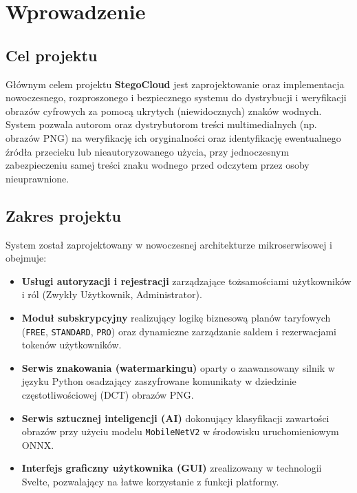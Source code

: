 \documentclass[12pt,a4paper]{article}
\begin{document}
\newpage

{
  \hypersetup{linkcolor=black}
  \tableofcontents
}
\newpage

\section{Wprowadzenie}

\subsection{Cel projektu}
Głównym celem projektu \textbf{StegoCloud} jest zaprojektowanie oraz implementacja nowoczesnego, rozproszonego i bezpiecznego systemu do dystrybucji i weryfikacji obrazów cyfrowych za pomocą ukrytych (niewidocznych) znaków wodnych. System pozwala autorom oraz dystrybutorom treści multimedialnych (np. obrazów PNG) na weryfikację ich oryginalności oraz identyfikację ewentualnego źródła przecieku lub nieautoryzowanego użycia, przy jednoczesnym zabezpieczeniu samej treści znaku wodnego przed odczytem przez osoby nieuprawnione.

\subsection{Zakres projektu}
System został zaprojektowany w nowoczesnej architekturze mikroserwisowej i obejmuje:
\begin{itemize}
    \item \textbf{Usługi autoryzacji i rejestracji} zarządzające tożsamościami użytkowników i ról (Zwykły Użytkownik, Administrator).
    \item \textbf{Moduł subskrypcyjny} realizujący logikę biznesową planów taryfowych (\texttt{FREE}, \texttt{STANDARD}, \texttt{PRO}) oraz dynamiczne zarządzanie saldem i rezerwacjami tokenów użytkowników.
    \item \textbf{Serwis znakowania (watermarkingu)} oparty o zaawansowany silnik w języku Python osadzający zaszyfrowane komunikaty w dziedzinie częstotliwościowej (DCT) obrazów PNG.
    \item \textbf{Serwis sztucznej inteligencji (AI)} dokonujący klasyfikacji zawartości obrazów przy użyciu modelu \texttt{MobileNetV2} w środowisku uruchomieniowym ONNX.
    \item \textbf{Interfejs graficzny użytkownika (GUI)} zrealizowany w technologii Svelte, pozwalający na łatwe korzystanie z funkcji platformy.
\end{itemize}
\end{document}
